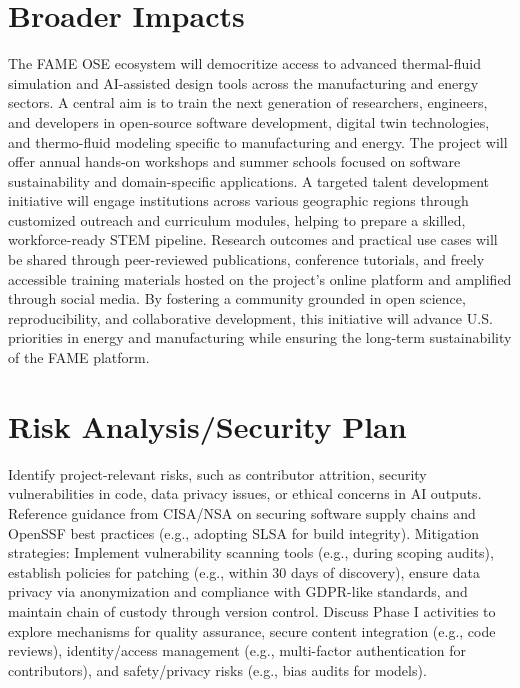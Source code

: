 \documentclass[11pt]{article}
\begin{document}
\section*{Broader Impacts}
\vspace{-3pt}
\noindent
The FAME OSE ecosystem will democritize access to advanced thermal-fluid simulation and AI-assisted design tools across the manufacturing and energy sectors. A central aim is to train the next generation of researchers, engineers, and developers in open-source software development, digital twin technologies, and thermo-fluid modeling specific to manufacturing and energy. The project will offer annual hands-on workshops and summer schools focused on software sustainability and domain-specific applications. A targeted talent development initiative will engage institutions across various geographic regions through customized outreach and curriculum modules, helping to prepare a skilled, workforce-ready STEM pipeline. Research outcomes and practical use cases will be shared through peer-reviewed publications, conference tutorials, and freely accessible training materials hosted on the project's online platform and amplified through social media. By fostering a community grounded in open science, reproducibility, and collaborative development, this initiative will advance U.S. priorities in energy and manufacturing while ensuring the long-term sustainability of the FAME platform.


\section*{Risk Analysis/Security Plan}
\vspace{-3pt}
\noindent
Identify project-relevant risks, such as contributor attrition, security vulnerabilities in code, data privacy issues, or ethical concerns in AI outputs. Reference guidance from CISA/NSA on securing software supply chains and OpenSSF best practices (e.g., adopting SLSA for build integrity).
Mitigation strategies: Implement vulnerability scanning tools (e.g., during scoping audits), establish policies for patching (e.g., within 30 days of discovery), ensure data privacy via anonymization and compliance with GDPR-like standards, and maintain chain of custody through version control. Discuss Phase I activities to explore mechanisms for quality assurance, secure content integration (e.g., code reviews), identity/access management (e.g., multi-factor authentication for contributors), and safety/privacy risks (e.g., bias audits for models).
\vspace{-3pt}
\end{document}
